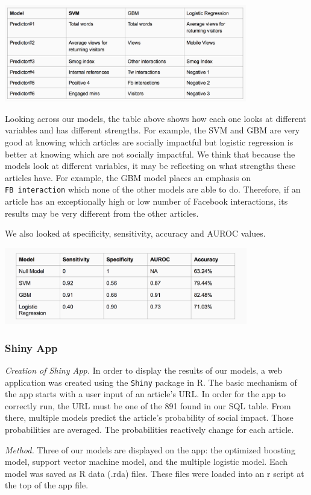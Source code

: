 \documentclass[10pt,letterpaper]{article}
\begin{document}
\includegraphics[width=400px]{model-comp-II}

Looking across our models, the table above shows how each one looks at
different variables and has different strengths. For example, the SVM
and GBM are very good at knowing which articles are socially impactful
but logistic regression is better at knowing which are not socially
impactful. We think that because the models look at different variables,
it may be reflecting on what strengths these articles have. For example,
the GBM model places an emphasis on \texttt{FB\ interaction} which none
of the other models are able to do. Therefore, if an article has an
exceptionally high or low number of Facebook interactions, its results
may be very different from the other articles.

We also looked at specificity, sensitivity, accuracy and AUROC values.

\includegraphics[width=401px]{model-comp}

\subsubsection{Shiny App}\label{shiny-app}

\emph{Creation of Shiny App.} In order to display the results of our
models, a web application was created using the \texttt{Shiny} package
in R. The basic mechanism of the app starts with a user input of an
article's URL. In order for the app to correctly run, the URL must be
one of the 891 found in our SQL table. From there, multiple models
predict the article's probability of social impact. Those probabilities
are averaged. The probabilities reactively change for each article.

\emph{Method.} Three of our models are displayed on the app: the
optimized boosting model, support vector machine model, and the multiple
logistic model. Each model was saved as R data (.rda) files. These files
were loaded into an r script at the top of the app file.
\end{document}
